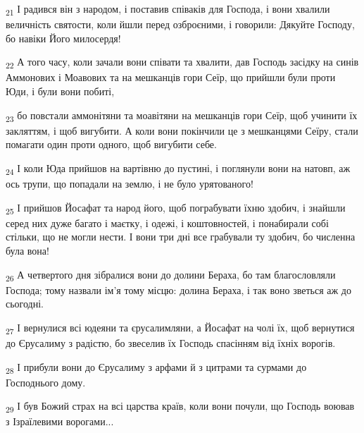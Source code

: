 \begin{tcolorbox}
\textsubscript{21} І радився він з народом, і поставив співаків для Господа, і вони хвалили величність святости, коли йшли перед озброєними, і говорили: Дякуйте Господу, бо навіки Його милосердя!
\end{tcolorbox}
\begin{tcolorbox}
\textsubscript{22} А того часу, коли зачали вони співати та хвалити, дав Господь засідку на синів Аммонових і Моавових та на мешканців гори Сеїр, що прийшли були проти Юди, і були вони побиті,
\end{tcolorbox}
\begin{tcolorbox}
\textsubscript{23} бо повстали аммонітяни та моавітяни на мешканців гори Сеїр, щоб учинити їх закляттям, і щоб вигубити. А коли вони покінчили це з мешканцями Сеїру, стали помагати один проти одного, щоб вигубити себе.
\end{tcolorbox}
\begin{tcolorbox}
\textsubscript{24} І коли Юда прийшов на вартівню до пустині, і поглянули вони на натовп, аж ось трупи, що попадали на землю, і не було урятованого!
\end{tcolorbox}
\begin{tcolorbox}
\textsubscript{25} І прийшов Йосафат та народ його, щоб пограбувати їхню здобич, і знайшли серед них дуже багато і маєтку, і одежі, і коштовностей, і понабирали собі стільки, що не могли нести. І вони три дні все грабували ту здобич, бо численна була вона!
\end{tcolorbox}
\begin{tcolorbox}
\textsubscript{26} А четвертого дня зібралися вони до долини Бераха, бо там благословляли Господа; тому назвали ім'я тому місцю: долина Бераха, і так воно зветься аж до сьогодні.
\end{tcolorbox}
\begin{tcolorbox}
\textsubscript{27} І вернулися всі юдеяни та єрусалимляни, а Йосафат на чолі їх, щоб вернутися до Єрусалиму з радістю, бо звеселив їх Господь спасінням від їхніх ворогів.
\end{tcolorbox}
\begin{tcolorbox}
\textsubscript{28} І прибули вони до Єрусалиму з арфами й з цитрами та сурмами до Господнього дому.
\end{tcolorbox}
\begin{tcolorbox}
\textsubscript{29} І був Божий страх на всі царства країв, коли вони почули, що Господь воював з Ізраїлевими ворогами...
\end{tcolorbox}
